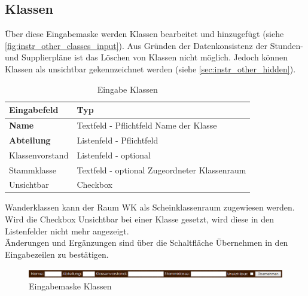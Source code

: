 \subsection{Klassen}
Über diese Eingabemaske werden Klassen bearbeitet und hinzugefügt (siehe \autoref{fig:instr_other_classes_input}). Aus Gründen der Datenkonsistenz der Stunden- und Supplierpläne ist das Löschen von Klassen nicht möglich. Jedoch können Klassen als unsichtbar gekennzeichnet werden (siehe \autoref{sec:instr_other_hidden}).
\begin{table}[H]
\centering
\begin{tabular}{p{3 cm}p{10 cm}}
   \toprule
   \textbf{Eingabefeld} & \textbf{Typ} \\
   \midrule
          \textbf{Name} & Textfeld - Pflichtfeld \newline Name der Klasse \\
          \hline
          \textbf{Abteilung} & Listenfeld - Pflichtfeld \\
          \hline
          Klassenvorstand & Listenfeld - optional \\
          \hline
          Stammklasse & Textfeld - optional \newline Zugeordneter Klassenraum \\
          \hline
          Unsichtbar & Checkbox \\
   \bottomrule
\end{tabular}
\caption{Eingabe Klassen}
\end{table}
Wanderklassen kann der Raum WK als Scheinklassenraum zugewiesen werden. Wird die Checkbox Unsichtbar bei einer Klasse gesetzt, wird diese in den Listenfelder nicht mehr angezeigt.\\
Änderungen und Ergänzungen sind über die Schaltfläche Übernehmen in den Eingabezeilen zu bestätigen.
\begin{figure}[H]
\centering
\includegraphics[keepaspectratio=true, width=17cm]{images/screenshots/classes_input.png}
\caption{Eingabemaske Klassen}
\label{fig:instr_other_classes_input}
\end{figure}
